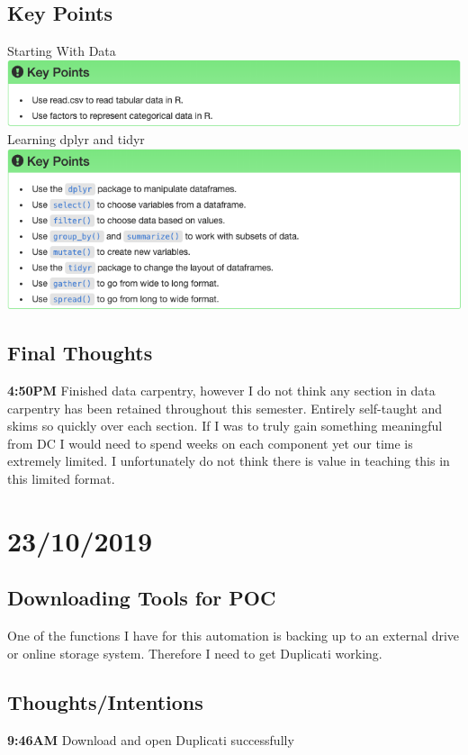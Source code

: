 \documentclass{article}
\begin{document}
\subsection{Key Points}
Starting With Data \\ 
\includegraphics[width=\textwidth]{Images/RStudio_13.png} \\
Learning dplyr and tidyr \\
\includegraphics[width=\textwidth]{Images/RStudio_18.png} 

\subsection{Final Thoughts}
\textbf{4:50PM} Finished data carpentry, however I do not think any section in data carpentry has been retained throughout this semester. Entirely self-taught and skims so quickly over each section. If I was to truly gain something meaningful from DC I would need to spend weeks on each component yet our time is extremely limited. I unfortunately do not think there is value in teaching this in this limited format. 

\section{23/10/2019}
\subsection{Downloading Tools for POC}
One of the functions I have for this automation is backing up to an external drive or online storage system. Therefore I need to get Duplicati working.
\subsection{Thoughts/Intentions}
\textbf{9:46AM} Download and open Duplicati successfully
\end{document}
